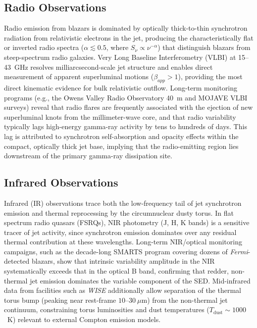 \documentclass[11pt]{article}
\begin{document}
\subsection{Radio Observations}

Radio emission from blazars is dominated by optically thick-to-thin synchrotron radiation from relativistic electrons in the jet, producing the characteristically flat or inverted radio spectra ($\alpha \lesssim 0.5$, where $S_\nu \propto \nu^{-\alpha}$) that distinguish blazars from steep-spectrum radio galaxies. Very Long Baseline Interferometry (VLBI) at 15--43~GHz resolves milliarcsecond-scale jet structure and enables direct measurement of apparent superluminal motions ($\beta_{app} > 1$), providing the most direct kinematic evidence for bulk relativistic outflow. Long-term monitoring programs (e.g., the Owens Valley Radio Observatory 40~m and MOJAVE VLBI surveys) reveal that radio flares are frequently associated with the ejection of new superluminal knots from the millimeter-wave core, and that radio variability typically lags high-energy gamma-ray activity by tens to hundreds of days. This lag is attributed to synchrotron self-absorption and opacity effects within the compact, optically thick jet base, implying that the radio-emitting region lies downstream of the primary gamma-ray dissipation site.

\subsection{Infrared Observations}

Infrared (IR) observations trace both the low-frequency tail of jet synchrotron emission and thermal reprocessing by the circumnuclear dusty torus. In flat spectrum radio quasars (FSRQs), NIR photometry (J, H, K bands) is a sensitive tracer of jet activity, since synchrotron emission dominates over any residual thermal contribution at these wavelengths. Long-term NIR/optical monitoring campaigns, such as the decade-long SMARTS program covering dozens of \textit{Fermi}-detected blazars, show that intrinsic variability amplitude in the NIR systematically exceeds that in the optical B band, confirming that redder, non-thermal jet emission dominates the variable component of the SED. Mid-infrared data from facilities such as \textit{WISE} additionally allow separation of the thermal torus bump (peaking near rest-frame $10$--$30~\mu$m) from the non-thermal jet continuum, constraining torus luminosities and dust temperatures ($T_{\text{dust}} \sim 1000$~K) relevant to external Compton emission models.
\end{document}
